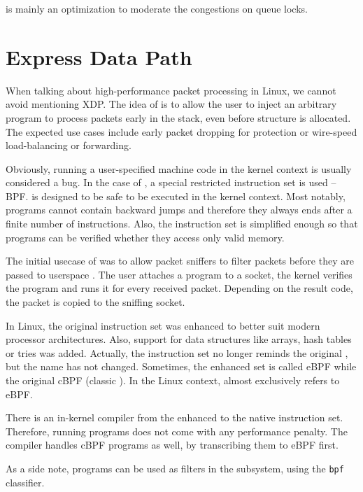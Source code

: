  is mainly an optimization to moderate the congestions on queue locks.

\section{Express Data Path}
\label{sec:xdp}

When talking about high-performance packet processing in Linux, we cannot avoid
mentioning \acrfull{XDP}. The idea of  is to allow the user to inject an
arbitrary program to process packets early in the stack, even before \skb{}
structure is allocated. The expected use cases include early packet dropping
for  protection or wire-speed load-balancing or forwarding.

Obviously, running a user-specified machine code in the kernel context is
usually considered a bug. In the case of , a special restricted
instruction set is used -- \acrlong{BPF}.  is designed to be safe to be
executed in the kernel context. Most notably,  programs cannot contain
backward jumps and therefore they always ends after a finite number of
instructions. Also, the instruction set is simplified enough so that programs
can be verified whether they access only valid memory.

The initial usecase of  was to allow packet sniffers to filter packets
before they are passed to userspace \cite{bpf-usenix}. The user attaches
a  program to a socket, the kernel verifies the program and runs it
for every received packet. Depending on the result code, the packet is copied
to the sniffing socket.

In Linux, the original  instruction set was enhanced to better suit modern
processor architectures. Also, support for data structures like arrays, hash
tables or tries was added. Actually, the instruction set no longer reminds the original ,
but the name has not changed. Sometimes, the enhanced set is called eBPF while
the original cBPF (classic ). In the Linux context,  almost
exclusively refers to eBPF.

There is an in-kernel  compiler from the enhanced  to the native
instruction set. Therefore, running  programs does not come with any
performance penalty. The compiler handles cBPF programs as well, by
transcribing them to eBPF first.

As a side note,  programs can be used as filters in the 
subsystem, using the \texttt{bpf} classifier.

